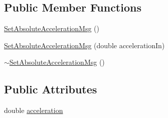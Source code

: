 \subsection*{Public Member Functions}
\begin{DoxyCompactItemize}
\item 
\hyperlink{class_set_absolute_acceleration_msg_adb27788704e46535480f4f1783820597}{SetAbsoluteAccelerationMsg} ()
\item 
\hyperlink{class_set_absolute_acceleration_msg_afeee376835089a6b999c5f81399365b5}{SetAbsoluteAccelerationMsg} (double accelerationIn)
\item 
\hyperlink{class_set_absolute_acceleration_msg_ae19228d8cdccccb04bdc37c9d955513e}{$\sim$SetAbsoluteAccelerationMsg} ()
\end{DoxyCompactItemize}
\subsection*{Public Attributes}
\begin{DoxyCompactItemize}
\item 
double \hyperlink{class_set_absolute_acceleration_msg_aae003f32dbcb00ab03c61b896c1b2c16}{acceleration}
\end{DoxyCompactItemize}


